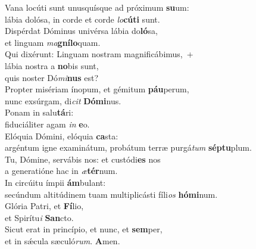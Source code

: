 \evenverse Vana locúti sunt unusquísque ad próximum \textbf{su}um:~\*\\
\evenverse lábia dolósa, in corde et corde \textit{lo}\textbf{cú}\textbf{ti} sunt.\\
\oddverse Dispérdat Dóminus univérsa lábia do\textbf{ló}sa,~\*\\
\oddverse et linguam \textit{ma}\textbf{gní}\textbf{lo}quam.\\
\evenverse Qui dixérunt: Linguam nostram magnificábimus,~+\\
\evenverse  lábia nostra a \textbf{no}bis sunt,~\*\\
\evenverse quis noster Dó\textit{mi}\textbf{nus} est?\\
\oddverse Propter misériam ínopum, et gémitum \textbf{páu}perum,~\*\\
\oddverse nunc exsúrgam, di\textit{cit} \textbf{Dó}\textbf{mi}nus.\\
\evenverse Ponam in salu\textbf{tá}ri:~\*\\
\evenverse fiduciáliter agam \textit{in} \textbf{e}o.\\
\oddverse Elóquia Dómini, elóquia \textbf{ca}sta:~\*\\
\oddverse argéntum igne examinátum, probátum terræ purgá\textit{tum} \textbf{sép}\textbf{tu}plum.\\
\evenverse Tu, Dómine, servábis nos: et custódi\textbf{es} nos~\*\\
\evenverse a generatióne hac in \textit{æ}\textbf{tér}num.\\
\oddverse In circúitu ímpii \textbf{ám}bulant:~\*\\
\oddverse secúndum altitúdinem tuam multiplicásti fíli\textit{os} \textbf{hó}\textbf{mi}num.\\
\evenverse Glória Patri, et \textbf{Fí}lio,~\*\\
\evenverse et Spirítu\textit{i} \textbf{San}cto.\\
\oddverse Sicut erat in princípio, et nunc, et \textbf{sem}per,~\*\\
\oddverse et in sǽcula sæculó\textit{rum}. \textbf{A}men.\\
